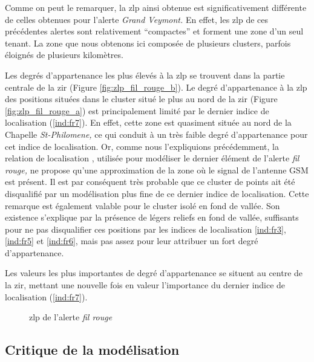Comme on peut le remarquer, la \ac{zlp} ainsi obtenue est
significativement différente de celles obtenues pour l'alerte
\emph{Grand Veymont.} En effet, les \ac{zlp} de ces précédentes
alertes sont relativement \enquote{compactes} et forment une zone d'un
seul tenant. La zone que nous obtenons ici composée de plusieurs
clusters, parfois éloignés de plusieurs kilomètres.

Les degrés d'appartenance les plus élevés à la \ac{zlp} se trouvent
dans la partie centrale de la \ac{zir} (Figure
\ref{fig:zlp_fil_rouge_b}).  Le degré d'appartenance à la \ac{zlp} des
positions situées dans le cluster situé le plus au nord de la \ac{zir}
(Figure \ref{fig:zlp_fil_rouge_a}) est principalement limité par le
dernier indice de localisation (\ref{ind:fr7}). En effet, cette zone
est quasiment située au nord de la Chapelle \emph{St-Philomene,} ce
qui conduit à un très faible degré d’appartenance pour cet indice de
localisation. Or, comme nous l'expliquions précédemment, la relation
de localisation , utilisée pour modéliser le
dernier élément de l'alerte \emph{fil rouge,} ne propose qu'une
approximation de la zone où le signal de l'antenne GSM est présent. Il
est par conséquent très probable que ce cluster de points ait été
disqualifié par un modélisation plus fine de ce dernier indice de
localisation. Cette remarque est également valable pour le cluster
isolé en fond de vallée. Son existence s'explique par la présence de
légers reliefs en fond de vallée, suffisants pour ne pas disqualifier
ces positions par les indices de localisation \ref{ind:fr3},
\ref{ind:fr5} et \ref{ind:fr6}, mais pas assez pour leur attribuer un
fort degré d'appartenance.

Les valeurs les plus importantes de degré d'appartenance se situent au
centre de la \ac{zir}, mettant une nouvelle fois en valeur
l'importance du dernier indice de localisation (\ref{ind:fr7}).

\begin{figure}
  \centering
  
  \caption{\ac{zlp} de l'alerte \emph{fil rouge}}
  \label{fig:zlp_fil_rouge}
\end{figure}

\subsection{Critique de la modélisation}
\label{subsec:9-4-3}

